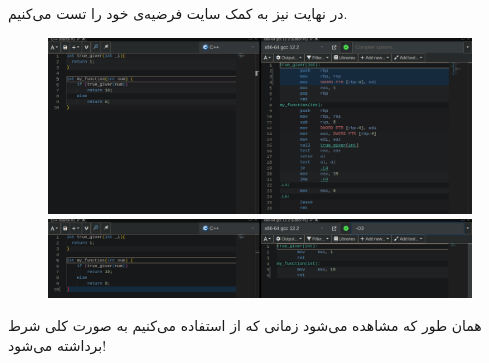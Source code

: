 \begin{enumerate}
\begin{enumerate}
        در نهایت نیز به کمک سایت
        فرضیه‌ی خود را تست می‌کنیم.
        \begin{figure}[H]
            \centerline{\includegraphics[scale=0.3]{pics/5/A/godbolt_o0.png}}
            \centerline{\includegraphics[scale=0.3]{pics/5/A/godbolt_o3.png}}
        \end{figure}
        همان طور که مشاهده می‌شود زمانی که از 
        استفاده می‌کنیم به صورت کلی شرط برداشته می‌شود!
    \end{enumerate}
\end{enumerate}